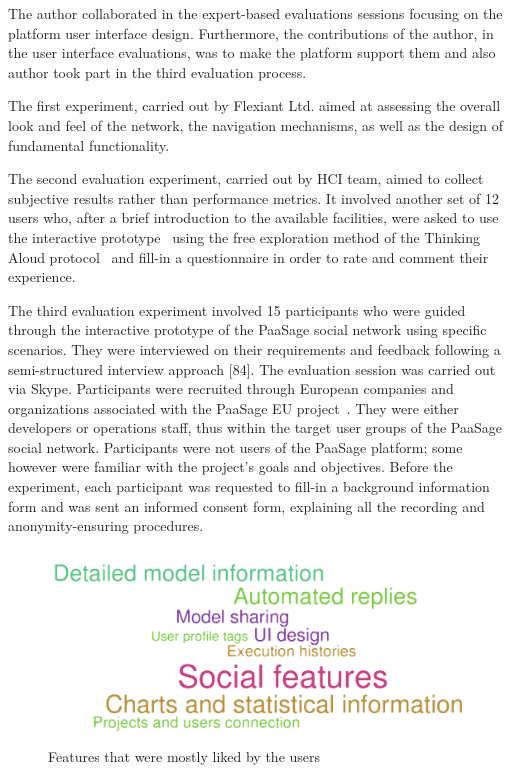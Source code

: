 The author collaborated in the expert-based evaluations sessions focusing on the platform user interface design. Furthermore, the contributions of the author, in the user interface evaluations, was to make the platform support them and also author took part in the third evaluation process.  

The first experiment, carried out by Flexiant Ltd. aimed at assessing the overall look and feel of the network, the navigation mechanisms, as well as the design of fundamental functionality.

The second evaluation experiment, carried out by HCI team, aimed to collect subjective results rather than performance metrics. It involved another set of 12 users who, after a brief introduction to the available facilities, were asked to use the interactive prototype~\cite{Virzi1996} using the free exploration method of the Thinking Aloud protocol~\cite{jordan1998introduction} and fill-in a questionnaire in order to rate and comment their experience. 

The third evaluation experiment involved 15 participants who were guided through the interactive prototype of the PaaSage social network using specific scenarios. They were interviewed on their requirements and feedback following a semi-structured interview approach [84]. The evaluation session was carried out via Skype. Participants were recruited through European companies and organizations associated with the PaaSage EU project~\cite{paasage}. They were either developers or operations staff, thus within the target user groups of the PaaSage social network. Participants were not users of the PaaSage platform; some however were familiar with the project’s goals and objectives. Before the experiment, each participant was requested to fill-in a background information form and was sent an informed consent form, explaining all the recording and anonymity-ensuring procedures. 

\begin{figure}[h]
	\centering
	\includegraphics[width=1\textwidth,natwidth=200,natheight=150]{./fig/most-liked.pdf}
	\caption{Features that were mostly liked by the users}
	\label{fig:most-liked}
\end{figure}

